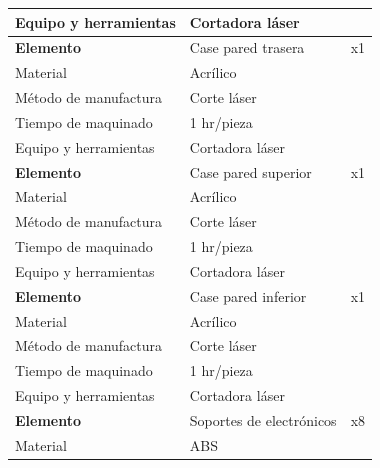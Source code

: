 \begin{longtable}{@{} p{4.2cm} p{8.8cm} r @{}}
Equipo y herramientas & Cortadora láser                                                    &    \\
\midrule
\textbf{Elemento}     & Case pared trasera                                                 & x1 \\
Material              & Acrílico                                                           &    \\
Método de manufactura & Corte láser                                                        &    \\
Tiempo de maquinado   & 1 hr/pieza                                                         &    \\
Equipo y herramientas & Cortadora láser                                                    &    \\
\midrule
\textbf{Elemento}     & Case pared superior                                                & x1 \\
Material              & Acrílico                                                           &    \\
Método de manufactura & Corte láser                                                        &    \\
Tiempo de maquinado   & 1 hr/pieza                                                         &    \\
Equipo y herramientas & Cortadora láser                                                    &    \\
\midrule
\textbf{Elemento}     & Case pared inferior                                                & x1 \\
Material              & Acrílico                                                           &    \\
Método de manufactura & Corte láser                                                        &    \\
Tiempo de maquinado   & 1 hr/pieza                                                         &    \\
Equipo y herramientas & Cortadora láser                                                    &    \\
\midrule
\textbf{Elemento}     & Soportes de electrónicos                                           & x8 \\
Material              & ABS                                                                &    \\

\end{longtable}
